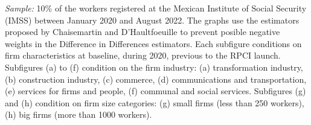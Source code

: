 \documentclass[oneside,11pt]{article}
\begin{document}
\scriptsize{
\noindent \textit{Sample:} 10\% of the workers registered at the Mexican Institute of Social Security (IMSS) between January 2020 and August 2022. The graphs use the estimators proposed by Chaisemartin and D'Haultfoeuille to prevent posible negative weights in the Difference in Differences estimators. Each subfigure conditions on firm characteristics at baseline, during 2020, previous to the RPCI launch. Subfigures (a) to (f) condition on the firm industry: (a) transformation industry, (b) construction industry, (c) commerce, (d) communications and transportation, (e) services for firms and people, (f) communal and social services. Subfigures (g) and (h) condition on firm size categories: (g) small firms (less than 250 workers), (h) big firms (more than 1000 workers).
}

\clearpage
\end{document}
